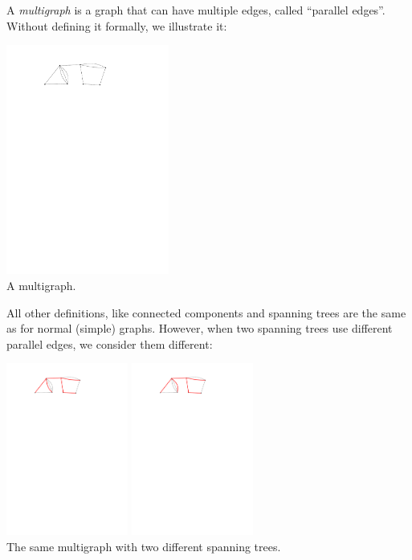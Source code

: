 



    A \textit{multigraph} is a graph that can have multiple edges, called ``parallel edges''. Without defining it formally, we illustrate it:
    \begin{center}
        \includegraphics[width=0.4\textwidth]{figures/multigraph.pdf}\\
        A multigraph.
    \end{center}
    All other definitions, like connected components and spanning trees are the same as for normal (simple) graphs. However, when two spanning trees use different parallel edges, we consider them different:
    \begin{center}
        \includegraphics[width=0.3\textwidth]{figures/multigraph-forest.pdf} \hspace{2cm}
        \includegraphics[width=0.3\textwidth]{figures/multigraph-forest-other.pdf} \\
        The same multigraph with two different spanning trees.
    \end{center}


